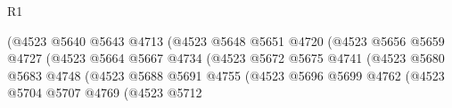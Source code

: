 \begin{lexlean}{R1}
\begin{coremodule}
                                                      (@4523
                                                        @5640
                                                        @5643
                                                        @4713
                                                        (@4523
                                                          @5648
                                                          @5651
                                                          @4720
                                                          (@4523
                                                            @5656
                                                            @5659
                                                            @4727
                                                            (@4523
                                                              @5664
                                                              @5667
                                                              @4734
                                                              (@4523
                                                                @5672
                                                                @5675
                                                                @4741
                                                                (@4523
                                                                  @5680
                                                                  @5683
                                                                  @4748
                                                                  (@4523
                                                                    @5688
                                                                    @5691
                                                                    @4755
                                                                    (@4523
                                                                      @5696
                                                                      @5699
                                                                      @4762
                                                                      (@4523
                                                                        @5704
                                                                        @5707
                                                                        @4769
                                                                        (@4523
                                                                          @5712

\end{coremodule}
\end{lexlean}
